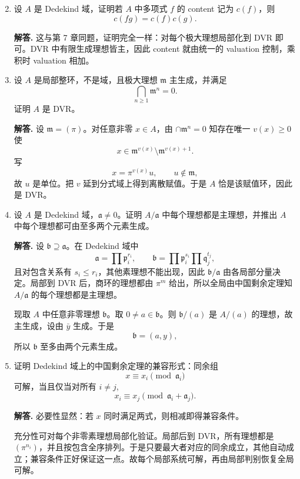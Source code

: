 \documentclass[a4paper]{ctexart}
\begin{document}
\begin{enumerate}[leftmargin=*, label=\textbf{9.\arabic*.}]
\setcounter{enumi}{1}
\item 设 \(A\) 是 Dedekind 域，证明若 \(A\) 中多项式 \(f\) 的 content 记为 \(c(f)\)，则
\[
c(fg)=c(f)c(g).
\]

\textbf{解答.}
这与第 7 章同题，证明完全一样：对每个极大理想局部化到 DVR 即可。DVR 中有限生成理想皆主，因此 content 就由统一的 valuation 控制，乘积时 valuation 相加。

\setcounter{enumi}{3}
\item 设 \(A\) 是局部整环，不是域，且极大理想 \(\mathfrak m\) 主生成，并满足
\[
\bigcap_{n\ge 1}\mathfrak m^n=0.
\]
证明 \(A\) 是 DVR。

\textbf{解答.}
设 \(\mathfrak m=(\pi)\)。对任意非零 \(x\in A\)，由 \(\cap \mathfrak m^n=0\) 知存在唯一 \(v(x)\ge 0\) 使
\[
x\in \mathfrak m^{v(x)}\setminus \mathfrak m^{v(x)+1}.
\]
写
\[
x=\pi^{v(x)}u,\qquad u\notin \mathfrak m,
\]
故 \(u\) 是单位。把 \(v\) 延到分式域上得到离散赋值。于是 \(A\) 恰是该赋值环，因此是 DVR。

\setcounter{enumi}{6}
\item 设 \(A\) 是 Dedekind 域，\(\mathfrak a\ne 0\)。证明 \(A/\mathfrak a\) 中每个理想都是主理想，并推出 \(A\) 中每个理想都可由至多两个元素生成。

\textbf{解答.}
设 \(\mathfrak b\supseteq \mathfrak a\)。在 Dedekind 域中
\[
\mathfrak a=\prod \mathfrak p_i^{r_i},\qquad \mathfrak b=\prod \mathfrak p_i^{s_i}\prod \mathfrak q_j^{t_j},
\]
且对包含关系有 \(s_i\le r_i\)，其他素理想不能出现，因此 \(\mathfrak b/\mathfrak a\) 由各局部分量决定。局部到 DVR 后，商环的理想都由 \(\pi^m\) 给出，所以全局由中国剩余定理知 \(A/\mathfrak a\) 的每个理想都是主理想。

现取 \(A\) 中任意非零理想 \(\mathfrak b\)。取 \(0\ne a\in \mathfrak b\)。则 \(\mathfrak b/(a)\) 是 \(A/(a)\) 的理想，故主生成，设由 \(\bar y\) 生成。于是
\[
\mathfrak b=(a,y),
\]
所以 \(\mathfrak b\) 至多由两个元素生成。

\setcounter{enumi}{8}
\item 证明 Dedekind 域上的中国剩余定理的兼容形式：同余组
\[
x\equiv x_i \pmod{\mathfrak a_i}
\]
可解，当且仅当对所有 \(i\ne j\),
\[
x_i\equiv x_j \pmod{\mathfrak a_i+\mathfrak a_j}.
\]

\textbf{解答.}
必要性显然：若 \(x\) 同时满足两式，则相减即得兼容条件。

充分性可对每个非零素理想局部化验证。局部后到 DVR，所有理想都是 \((\pi^{n_i})\)，并且按包含全序排列。于是只要最大者对应的同余成立，其他自动成立；兼容条件正好保证这一点。故每个局部系统可解，再由局部判别恢复全局可解。
\end{enumerate}
\end{document}
